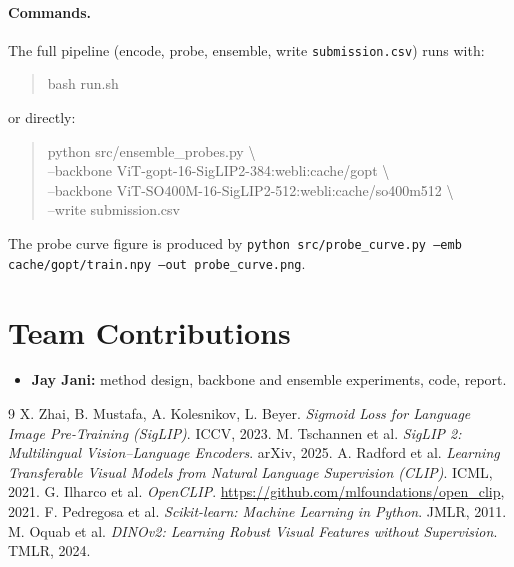 \documentclass[11pt]{article}
\begin{document}
\paragraph{Commands.} The full pipeline (encode, probe, ensemble, write
\texttt{submission.csv}) runs with:
\begin{quote}\small\ttfamily
bash run.sh
\end{quote}
or directly:
\begin{quote}\small\ttfamily
python src/ensemble\_probes.py \textbackslash\\
\hspace*{1em}--backbone ViT-gopt-16-SigLIP2-384:webli:cache/gopt \textbackslash\\
\hspace*{1em}--backbone ViT-SO400M-16-SigLIP2-512:webli:cache/so400m512 \textbackslash\\
\hspace*{1em}--write submission.csv
\end{quote}
The probe curve figure is produced by
\texttt{python src/probe\_curve.py --emb cache/gopt/train.npy --out probe\_curve.png}.

\section{Team Contributions}

\begin{itemize}
  \item \textbf{Jay Jani:} method design, backbone and ensemble experiments,
        code, report. %
\end{itemize}

\begin{thebibliography}{9}
\small
{} X. Zhai, B. Mustafa, A. Kolesnikov, L. Beyer.
  \emph{Sigmoid Loss for Language Image Pre-Training (SigLIP)}. ICCV, 2023.
 M. Tschannen et al.
  \emph{SigLIP 2: Multilingual Vision--Language Encoders}. arXiv, 2025.
 A. Radford et al.
  \emph{Learning Transferable Visual Models from Natural Language Supervision
  (CLIP)}. ICML, 2021.
 G. Ilharco et al. \emph{OpenCLIP}.
  \url{https://github.com/mlfoundations/open_clip}, 2021.
 F. Pedregosa et al.
  \emph{Scikit-learn: Machine Learning in Python}. JMLR, 2011.
 M. Oquab et al.
  \emph{DINOv2: Learning Robust Visual Features without Supervision}. TMLR, 2024.
\end{thebibliography}
\end{document}
